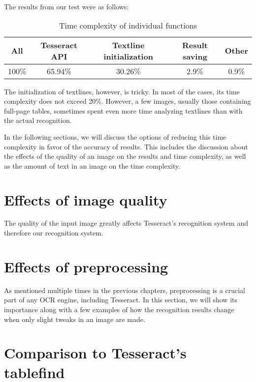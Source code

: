 The results from our test were as follows:

\begin{table}[H]
\centering
\begin{tabular}{ccccc}
\toprule
\textbf{All} & \textbf{Tesseract API} & \textbf{Textline initialization} & \textbf{Result saving} & \textbf{Other}\\
\midrule
100\% & 65.94\% & 30.26\% & 2.9\% & 0.9\% \\
\bottomrule
\end{tabular}
\caption{Time complexity of individual functions} 
\label{table:forward-inverted}
\end{table}

The initialization of textlines, however, is tricky. In most of the cases, its time complexity does not exceed 20\%. However, a few images, usually those containing full-page tables, sometimes spent even more time analyzing textlines than with the actual recognition.

In the following sections, we will discuss the options of reducing this time complexity in favor of the accuracy of results. This includes the discussion about the effects of the quality of an image on the results and time complexity, as well as the amount of text in an image on the time complexity.

\section{Effects of image quality}

The quality of the input image greatly affects Tesseract's recognition system and therefore our recognition system.


\section{Effects of preprocessing}

As mentioned multiple times in the previous chapters, preprocessing is a crucial part of any OCR engine, including Tesseract. In this section, we will show its importance along with a few examples of how the recognition results change when only slight tweaks in an image are made.





\section{Comparison to Tesseract's tablefind}